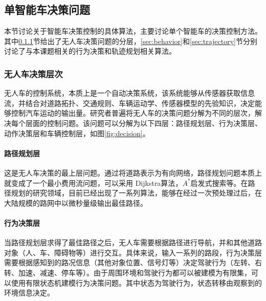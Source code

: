   \subsection{单智能车决策问题}
    \label{sec:single}
    本节讨论关于智能车决策控制的具体算法，主要讨论单个智能车的决策控制方法。其中\ref{sec:hierarchy}节给出了无人车决策问题的分层，\ref{sec:behavior}和\ref{sec:trajectory}节分别讨论了与本课题相关的行为决策和轨迹规划相关算法。

    \subsubsection{无人车决策层次}
    \label{sec:hierarchy}
      无人车的控制系统，本质上是一个自动决策系统，该系统能够从传感器获取信息流，并结合对道路拓扑、交通规则、车辆运动学、传感器模型的先验知识，决定能够控制汽车运动的输出量。研究者普遍将无人车的决策问题分解为不同的层次，解决每个层面的控制问题。该问题可以分解为以下四层：路径规划层、行为决策层、动作决策层和车辆控制层\cite{paden2016survey}，如图\ref{fig:decision}。


      \paragraph{路径规划层} 这是无人车决策的最上层问题。通过将道路表示为有向网络，路径规划问题本质上就变成了一个最小费用流问题，可以采用 Dijkstra算法\cite{Dijkstra1959A}，$A^*$启发式搜索\cite{Nilsson1969A}等。在路径规划的研究领域，目前已经出现了一系列算法，能够在经过一次预处理过后，在大陆规模的路网中以微秒量级输出最佳路径\cite{Goldberg2003Computing,Geisberger2012Exact}。

      \paragraph{行为决策层} 当路径规划层求得了最佳路径之后，无人车需要根据路径进行导航，并和其他道路对象（人、车、障碍物等）进行交互。具体来说，输入一系列的路段，行为决策层需要根据感知到的路况信息（其他对象位置、信号灯等）决定驾驶行为（左转、右转、加速、减速、停车等）。由于周围环境和驾驶行为都可以被建模为有限集，可以使用有限状态机建模行为决策问题。其中状态为驾驶行为，状态转移由观察到的环境信息决定。

